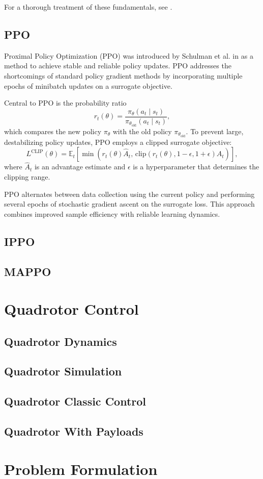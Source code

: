 For a thorough treatment of these fundamentals, see \cite{SuttonBarto2018}.



\subsection{PPO}
Proximal Policy Optimization (PPO) was introduced by Schulman et al. in \cite{schulman2017proximal} as a method to achieve stable and reliable policy updates. PPO addresses the shortcomings of standard policy gradient methods by incorporating multiple epochs of minibatch updates on a surrogate objective.

Central to PPO is the probability ratio
\[
r_t(\theta) = \frac{\pi_\theta(a_t \mid s_t)}{\pi_{\theta_{\text{old}}}(a_t \mid s_t)},
\]
which compares the new policy \(\pi_\theta\) with the old policy \(\pi_{\theta_{\text{old}}}\). To prevent large, destabilizing policy updates, PPO employs a clipped surrogate objective:
\begin{equation}
    L^{\text{CLIP}}(\theta) = \mathbb{E}_t\left[ \min\left(r_t(\theta)\hat{A}_t,\, \text{clip}\left(r_t(\theta), 1-\epsilon, 1+\epsilon\right)\hat{A}_t\right) \right],
\end{equation}
where \(\hat{A}_t\) is an advantage estimate and \(\epsilon\) is a hyperparameter that determines the clipping range.

PPO alternates between data collection using the current policy and performing several epochs of stochastic gradient ascent on the surrogate loss. This approach combines improved sample efficiency with reliable learning dynamics.
\subsection{IPPO}
\subsection{MAPPO}

\section{Quadrotor Control}
\subsection{Quadrotor Dynamics}
\subsection{Quadrotor Simulation}
\subsection{Quadrotor Classic Control}
\subsection{Quadrotor With Payloads}

\section{Problem Formulation}


